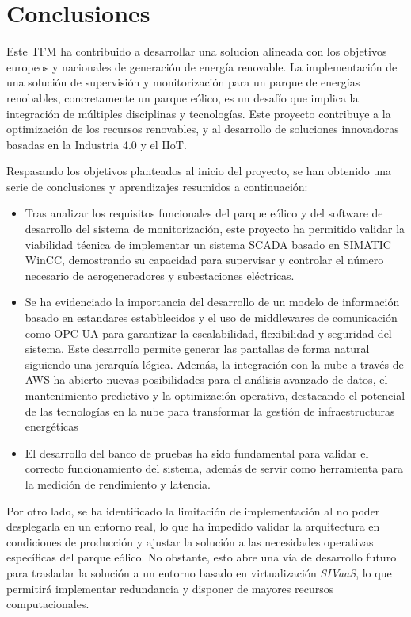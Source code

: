 \chapter{Conclusiones}
\label{cap:conclusiones}

Este \ac{TFM} ha contribuido a desarrollar una solucion alineada con los objetivos europeos y nacionales de generación de energía renovable. La implementación de una solución de supervisión y monitorización para un parque de energías renobables, concretamente un parque eólico, es un desafío que implica la integración de múltiples disciplinas y tecnologías. Este proyecto contribuye a la optimización de los recursos renovables, y al desarrollo de soluciones innovadoras basadas en la Industria 4.0 y el \ac{IIoT}.

Respasando los objetivos planteados al inicio del proyecto, se han obtenido una serie de conclusiones y aprendizajes resumidos a continuación:

\begin{itemize}
    \item Tras analizar los requisitos funcionales del parque eólico y del software de desarrollo del sistema de monitorización, este proyecto ha permitido validar la viabilidad técnica de implementar un sistema \ac{SCADA} basado en SIMATIC WinCC, demostrando su capacidad para supervisar y controlar el número necesario de aerogeneradores y subestaciones eléctricas.
    \item Se ha evidenciado la importancia del desarrollo de un modelo de información basado en estandares estabblecidos y el uso de middlewares de comunicación como \ac{OPC UA} para garantizar la escalabilidad, flexibilidad y seguridad del sistema. Este desarrollo permite generar las pantallas de forma natural siguiendo una jerarquía lógica. Además, la integración con la nube a través de \ac{AWS} ha abierto nuevas posibilidades para el análisis avanzado de datos, el mantenimiento predictivo y la optimización operativa, destacando el potencial de las tecnologías en la nube para transformar la gestión de infraestructuras energéticas
    \item El desarrollo del banco de pruebas ha sido fundamental para validar el correcto funcionamiento del sistema, además de servir como herramienta para la medición de rendimiento y latencia.
\end{itemize}

Por otro lado, se ha identificado la limitación de implementación al no poder desplegarla en un entorno real, lo que ha impedido validar la arquitectura en condiciones de producción y ajustar la solución a las necesidades operativas específicas del parque eólico. No obstante, esto abre una vía de desarrollo futuro para trasladar la solución a un entorno basado en virtualización \textit{\ac{SIVaaS}}, lo que permitirá implementar redundancia y disponer de mayores recursos computacionales.

